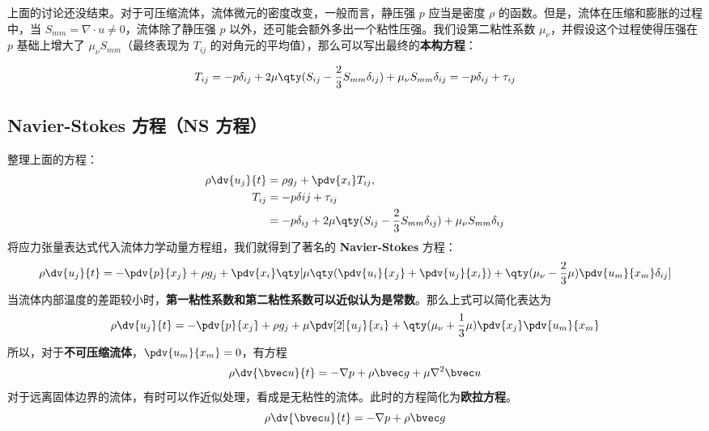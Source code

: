 上面的讨论还没结束。对于可压缩流体，流体微元的密度改变，一般而言，静压强 $p$ 应当是密度 $\rho$ 的函数。但是，流体在压缩和膨胀的过程中，当 $S_{mm}=\nabla\cdot u\neq 0$，流体除了静压强 $p$ 以外，还可能会额外多出一个粘性压强。我们设第二粘性系数 $\mu_\nu$，并假设这个过程使得压强在 $p$ 基础上增大了 $\mu_\nu S_{mm}$（最终表现为 $T_{ij}$ 的对角元的平均值），那么可以写出最终的\textbf{本构方程}：

\begin{equation}\label{NSeq_eq1}
T_{ij}=-p\delta_{ij}+2\mu \qty(S_{ij}-\frac{2}{3}S_{mm}\delta_{ij})+\mu_\nu S_{mm} \delta_{ij}=-p\delta_{ij}+\tau_{ij}
\end{equation}

\subsection{Navier-Stokes 方程（NS 方程）}
整理上面的方程：
\begin{equation}
\begin{aligned}
\rho \dv{u_j}{t}&=\rho g_j+\pdv{x_i} T_{ij},\\
T_{ij}&=-p\delta{ij}+\tau_{ij}\\
&=-p\delta_{ij}+2\mu \qty(S_{ij}-\frac{2}{3}S_{mm}\delta_{ij})+\mu_\nu S_{mm} \delta_{ij}
\end{aligned}
\end{equation}
将应力张量表达式代入流体力学动量方程组，我们就得到了著名的 \textbf{Navier-Stokes} 方程：
\begin{equation}
\rho \dv{u_j}{t}=-\pdv{p}{x_j}+\rho g_j+\pdv{x_i} \qty[\mu\qty(\pdv{u_i}{x_j}+\pdv{u_j}{x_i})+\qty(\mu_\nu-\frac{2}{3}\mu)\pdv{u_m}{x_m}\delta_{ij}]
\end{equation}
当流体内部温度的差距较小时，\textbf{第一粘性系数和第二粘性系数可以近似认为是常数}。那么上式可以简化表达为
\begin{equation}\label{NSeq_eq2}
\rho \dv{u_j}{t}=-\pdv{p}{x_j}+\rho g_j+\mu\pdv[2]{u_j}{x_i} +\qty(\mu_\nu+\frac{1}{3}\mu)\pdv{x_j}\pdv{u_m}{x_m}
\end{equation}
所以，对于\textbf{不可压缩流体}，$\pdv{u_m}{x_m}=0$，有方程
\begin{equation}
\rho \dv{\bvec u}{t}=-\nabla p+\rho \bvec g+\mu \nabla^2 \bvec u
\end{equation}
对于远离固体边界的流体，有时可以作近似处理，看成是无粘性的流体。此时的方程简化为\textbf{欧拉方程}。
\begin{equation}
\rho \dv{\bvec u}{t}=-\nabla p+\rho \bvec g
\end{equation}
